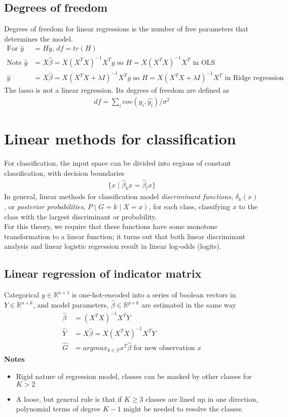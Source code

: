 \documentclass{article}
\begin{document}
\subsection{Degrees of freedom}
Degrees of freedom for linear regressions is the number of free parameters that determines the model. 
\begin{align*}
  \textrm{For } \hat{y} &= Hy \textrm{, } df = tr(H)\\
  \textrm{Note } \hat{y} &= X\hat{\beta} = X(X^TX)^{-1}X^Ty \textrm{ so } H = X(X^TX)^{-1}X^T \textrm{ in OLS}\\
  \hat{y} &= X\hat{\beta} = X(X^TX + \lambda I)^{-1}X^Ty \textrm{ so } H = X(X^TX + \lambda I)^{-1}X^T \textrm{ in Ridge regression}
\end{align*}
The lasso is not a linear regression. Its degrees of freedom are defined as
\begin{align*}
  df = \sum_i cov(y_i, \hat{y_i}) / \sigma^2
\end{align*}

\section{Linear methods for classification}
For classification, the input space can be divided into regions of constant classification, with decision boundaries
\begin{align*}
  \{ x \mid \hat{\beta}_kx = \hat{\beta}_lx \}
\end{align*}
In general, linear methods for classification model \textit{discriminant functions}, $\delta_k(x)$, or \textit{posterior probabilities}, $P(G=k \mid X=x)$, for each class, classifying $x$ to the class with the largest discriminant or probability.\\
For this theory, we require that these functions have some monotone transformation to a linear function; it turns out that both linear discriminant analysis and linear logistic regression result in linear log-odds (logits).
\subsection{Linear regression of indicator matrix}
Categorical $y \in \mathbb{R}^{n \times 1}$ is one-hot-encoded into a series of boolean vectors in $Y \in \mathbb{R}^{n\times k}$, and model parameters, $\hat{\beta} \in \mathbb{R}^{p \times k}$ are estimated in the same way
\begin{align*}
  \hat{\beta} &= (X^TX)^{-1}X^TY\\
  \hat{Y} &= X\hat{\beta} = X(X^TX)^{-1}X^TY\\
  \hat{G} &= argmax_{k\in \mathcal{G}} x^T\hat{\beta} \textrm{ for new observation } x
\end{align*}
\textbf{Notes}
\begin{itemize}
  \item Rigid nature of regression model, classes can be masked by other classes for $K > 2$
  \item A loose, but general rule is that if $K \geq 3$ classes are lined up in one direction, polynomial terms of degree $K - 1$ might be needed to resolve the classes. 
\end{itemize}
\end{document}
